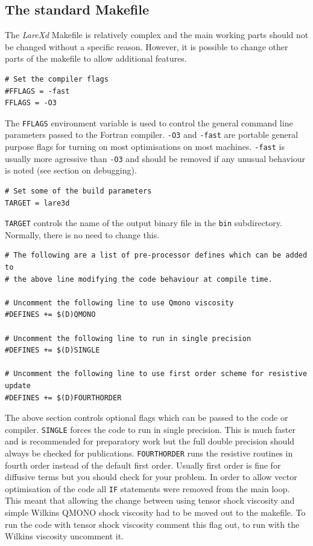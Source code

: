 \documentclass[11pt]{article}
\begin{document}
\subsection{The standard Makefile}
The {\it LareXd} Makefile is relatively complex and the main working parts should not be changed without a specific reason. However, it is possible to change other parts of the makefile to allow additional features.\\
\begin{verbatim}
# Set the compiler flags
#FFLAGS = -fast
FFLAGS = -O3
\end{verbatim}
The \texttt{FFLAGS} environment variable is used to control the general command line parameters passed to the Fortran compiler. \texttt{-O3} and \texttt{-fast} are portable general purpose flags for turning on most optimisations on most machines. \texttt{-fast} is usually more agressive than \texttt{-O3} and should be removed if any unusual behaviour is noted (see section on debugging).
\begin{verbatim}
# Set some of the build parameters
TARGET = lare3d
\end{verbatim}
\texttt{TARGET} controls the name of the output binary
file in the \texttt{bin} subdirectory. Normally, there is no need to change this.
\begin{verbatim}
# The following are a list of pre-processor defines which can be added to
# the above line modifying the code behaviour at compile time.

# Uncomment the following line to use Qmono viscosity
#DEFINES += $(D)QMONO

# Uncomment the following line to run in single precision
#DEFINES += $(D)SINGLE

# Uncomment the following line to use first order scheme for resistive update
#DEFINES += $(D)FOURTHORDER
\end{verbatim}
The above section controls optional flags which can be passed to the code or compiler. \texttt{SINGLE} forces the code to run in single precision. This is much faster and is recommended for preparatory work but the full double precision should always be checked for publications. \texttt{FOURTHORDER} runs the resistive routines in fourth order instead of the default first order. Usually first order is fine for diffusive terms but you should
check for your problem.
In order to allow vector optimisation of the code all \texttt{IF} statements were removed from the main loop. This meant that allowing the change between using tensor shock viscosity and simple Wilkins QMONO shock viscosity had to be moved out to the makefile. To run the code with tensor shock viscosity comment this flag out, to run with the Wilkins viscosity uncomment it.
\end{document}
